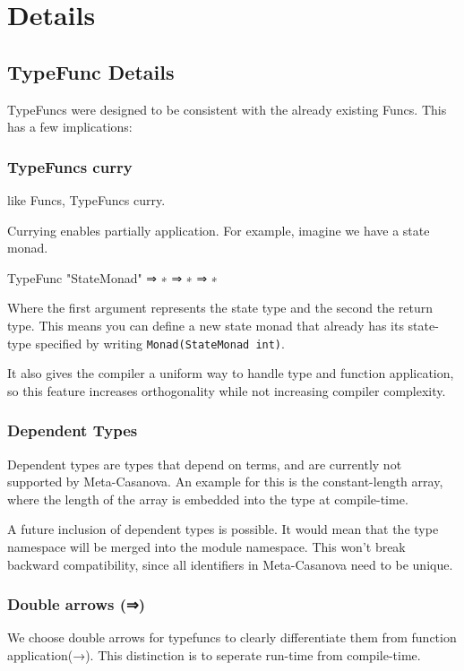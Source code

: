 \section{Details}

\pagebreak

\subsection{TypeFunc Details}
\begin{multicols}{2}\noindent
  TypeFuncs were designed to be consistent with the already existing Funcs.
  This has a few implications:

  \subsubsection*{TypeFuncs curry}
  like Funcs, TypeFuncs curry.

  Currying enables partially application.
  For example, imagine we have a state monad.
  
  \begin{code}
  TypeFunc "StateMonad" ⇒ ∗ ⇒ ∗ ⇒ ∗
  \end{code}

  \noindent Where the first argument represents the state type and the second the return type.
  This means you can define a new state monad that already has its state-type specified by writing \verb|Monad(StateMonad int)|.

  It also gives the compiler a uniform way to handle type and function application,
  so this feature increases orthogonality while not increasing compiler complexity.
  
  \subsubsection*{Dependent Types}
  Dependent types are types that depend on terms, and are currently not supported by Meta-Casanova.
  An example for this is the constant-length array, where the length of the array is embedded into the type at compile-time.
  
  A future inclusion of dependent types is possible.
  It would mean that the type namespace will be merged into the module namespace.
  This won't break backward compatibility, since all identifiers in Meta-Casanova need to be unique.

  \subsubsection*{Double arrows (⇒)}
  We choose double arrows for typefuncs to clearly differentiate them from function application(→).
  This distinction is to seperate run-time from compile-time.


\end{multicols}
